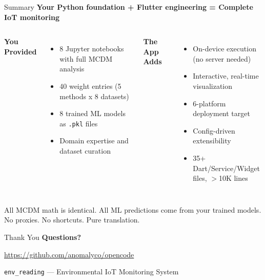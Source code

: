 \documentclass[aspectratio=169]{beamer}
\begin{document}
\begin{frame}{Summary}
  \centering
  \large \textbf{Your Python foundation + Flutter engineering = Complete IoT monitoring}

  \vspace{0.2cm}
  \begin{columns}[t]
    \textbf{You Provided}
    \begin{itemize}
      \item 8 Jupyter notebooks with full MCDM analysis
      \item 40 weight entries (5 methods x 8 datasets)
      \item 8 trained ML models as \texttt{.pkl} files
      \item Domain expertise and dataset curation
    \end{itemize}

    \textbf{The App Adds}
    \begin{itemize}
      \item On-device execution (no server needed)
      \item Interactive, real-time visualization
      \item 6-platform deployment target
      \item Config-driven extensibility
      \item 35+ Dart/Service/Widget files, $>$10K lines
    \end{itemize}
  \end{columns}

  \vspace{0.3cm}
  \centering
  \alert{All MCDM math is identical. All ML predictions come from your trained models.\\
  No proxies. No shortcuts. Pure translation.}
\end{frame}

\begin{frame}{Thank You}
  \centering
  \vspace{1cm}
  \Huge \textbf{Questions?}

  \vspace{0.5cm}
  \large \url{https://github.com/anomalyco/opencode}

  \vspace{1cm}
  \small \texttt{env\_reading} --- Environmental IoT Monitoring System
\end{frame}
\end{document}

